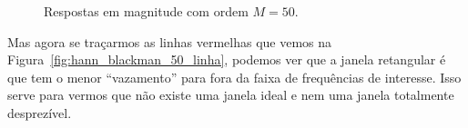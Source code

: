 \documentclass{homeworkclass}
\begin{document}
\begin{homeworkProblem}
\begin{figure}[!ht]
\caption{Respostas em magnitude com ordem $M = 50$.}
\label{fig:hann_blackman_50}
\end{figure}

Mas agora se traçarmos as linhas vermelhas que vemos na Figura~\ref{fig:hann_blackman_50_linha}, podemos ver que a janela retangular é que tem o menor ``vazamento'' para fora da faixa de frequências de interesse. Isso serve para vermos que não existe uma janela ideal e nem uma janela totalmente desprezível.

\begin{figure}[!h]
	\centering
	~
	\\
	~
	

\end{figure}
\end{homeworkProblem}
\end{document}
